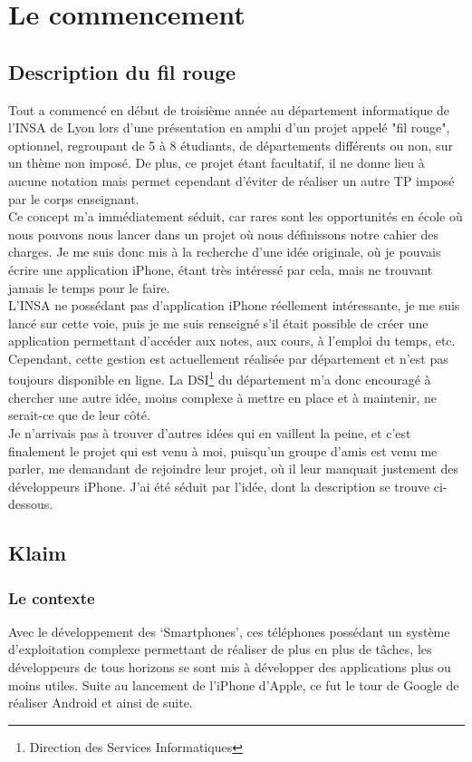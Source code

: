 \documentclass{article}
\begin{document}
\section{Le commencement}
\subsection{Description du fil rouge}
	Tout a commencé en début de troisième année au département informatique de l'INSA de Lyon lors d'une présentation en amphi d'un projet appelé "fil rouge", optionnel, regroupant de 5 à 8 étudiants, de départements différents ou non, sur un thème non imposé. De plus, ce projet étant facultatif, il ne donne lieu à aucune notation mais permet cependant d'éviter de réaliser un autre TP imposé par le corps enseignant.\\
	
	Ce concept m’a immédiatement séduit, car rares sont les opportunités en école où nous pouvons nous lancer dans un projet où nous définissons notre cahier des charges. Je me suis donc mis à la recherche d’une idée originale, où je pouvais écrire une application iPhone, étant très intéressé par cela, mais ne trouvant jamais le temps pour le faire.\\
	
	L'INSA ne possédant pas d'application iPhone réellement intéressante, je me suis lancé sur cette voie, puis je me suis renseigné s'il était possible de créer une application permettant d'accéder aux notes, aux cours, à l'emploi du temps, etc. Cependant, cette gestion est actuellement réalisée par département et n'est pas toujours disponible en ligne. La DSI\footnote{Direction des Services Informatiques} du département m'a donc encouragé à chercher une autre idée, moins complexe à mettre en place et à maintenir, ne serait-ce que de leur côté.\\
	
	Je n'arrivais pas à trouver d'autres idées qui en vaillent la peine, et c'est finalement le projet qui est venu à moi, puisqu’un groupe d’amis est venu me parler, me demandant de rejoindre leur projet, où il leur manquait justement des développeurs iPhone. J’ai été séduit par l’idée, dont la description se trouve ci-dessous.\\
	
	
\subsection{Klaim}
\subsubsection{Le contexte}
	Avec le développement des ‘Smartphones’, ces téléphones possédant un système d’exploitation complexe permettant de réaliser de plus en plus de tâches, les développeurs de tous horizons se sont mis à développer des applications plus ou moins utiles. Suite au lancement de l’iPhone d’Apple, ce fut le tour de Google de réaliser Android et ainsi de suite.\\
	
\end{document}
